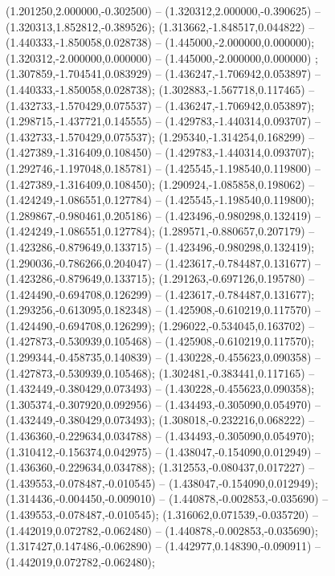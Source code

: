  (1.201250,2.000000,-0.302500) -- (1.320312,2.000000,-0.390625) -- (1.320313,1.852812,-0.389526);
 (1.313662,-1.848517,0.044822) -- (1.440333,-1.850058,0.028738) -- (1.445000,-2.000000,0.000000);
 (1.320312,-2.000000,0.000000) -- (1.445000,-2.000000,0.000000) ;
 (1.307859,-1.704541,0.083929) -- (1.436247,-1.706942,0.053897) -- (1.440333,-1.850058,0.028738);
 (1.302883,-1.567718,0.117465) -- (1.432733,-1.570429,0.075537) -- (1.436247,-1.706942,0.053897);
 (1.298715,-1.437721,0.145555) -- (1.429783,-1.440314,0.093707) -- (1.432733,-1.570429,0.075537);
 (1.295340,-1.314254,0.168299) -- (1.427389,-1.316409,0.108450) -- (1.429783,-1.440314,0.093707);
 (1.292746,-1.197048,0.185781) -- (1.425545,-1.198540,0.119800) -- (1.427389,-1.316409,0.108450);
 (1.290924,-1.085858,0.198062) -- (1.424249,-1.086551,0.127784) -- (1.425545,-1.198540,0.119800);
 (1.289867,-0.980461,0.205186) -- (1.423496,-0.980298,0.132419) -- (1.424249,-1.086551,0.127784);
 (1.289571,-0.880657,0.207179) -- (1.423286,-0.879649,0.133715) -- (1.423496,-0.980298,0.132419);
 (1.290036,-0.786266,0.204047) -- (1.423617,-0.784487,0.131677) -- (1.423286,-0.879649,0.133715);
 (1.291263,-0.697126,0.195780) -- (1.424490,-0.694708,0.126299) -- (1.423617,-0.784487,0.131677);
 (1.293256,-0.613095,0.182348) -- (1.425908,-0.610219,0.117570) -- (1.424490,-0.694708,0.126299);
 (1.296022,-0.534045,0.163702) -- (1.427873,-0.530939,0.105468) -- (1.425908,-0.610219,0.117570);
 (1.299344,-0.458735,0.140839) -- (1.430228,-0.455623,0.090358) -- (1.427873,-0.530939,0.105468);
 (1.302481,-0.383441,0.117165) -- (1.432449,-0.380429,0.073493) -- (1.430228,-0.455623,0.090358);
 (1.305374,-0.307920,0.092956) -- (1.434493,-0.305090,0.054970) -- (1.432449,-0.380429,0.073493);
 (1.308018,-0.232216,0.068222) -- (1.436360,-0.229634,0.034788) -- (1.434493,-0.305090,0.054970);
 (1.310412,-0.156374,0.042975) -- (1.438047,-0.154090,0.012949) -- (1.436360,-0.229634,0.034788);
 (1.312553,-0.080437,0.017227) -- (1.439553,-0.078487,-0.010545) -- (1.438047,-0.154090,0.012949);
 (1.314436,-0.004450,-0.009010) -- (1.440878,-0.002853,-0.035690) -- (1.439553,-0.078487,-0.010545);
 (1.316062,0.071539,-0.035720) -- (1.442019,0.072782,-0.062480) -- (1.440878,-0.002853,-0.035690);
 (1.317427,0.147486,-0.062890) -- (1.442977,0.148390,-0.090911) -- (1.442019,0.072782,-0.062480);
